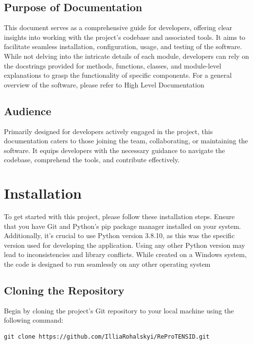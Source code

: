 \documentclass{report}
\begin{document}
\section{Purpose of Documentation}

This document serves as a comprehensive guide for developers, offering clear insights into working with the project's codebase and associated tools. It aims to facilitate seamless installation, configuration, usage, and testing of the software. While not delving into the intricate details of each module, developers can rely on the docstrings provided for methods, functions, classes, and module-level explanations to grasp the functionality of specific components. For a general overview of the software, please refer to High Level Documentation

\section{Audience}

Primarily designed for developers actively engaged in the project, this documentation caters to those joining the team, collaborating, or maintaining the software. It equips developers with the necessary guidance to navigate the codebase, comprehend the tools, and contribute effectively.


\chapter{Installation}

To get started with this project, please follow these installation steps. Ensure that you have Git and Python's pip package manager installed on your system. Additionally, it's crucial to use Python version 3.8.10, as this was the specific version used for developing the application. Using any other Python version may lead to inconsistencies and library conflicts. While created on a Windows system, the code is designed to run seamlessly on any other operating system

\section{Cloning the Repository}

Begin by cloning the project's Git repository to your local machine using the following command:

\begin{verbatim}
git clone https://github.com/IlliaRohalskyi/ReProTENSID.git
\end{verbatim}
\end{document}
